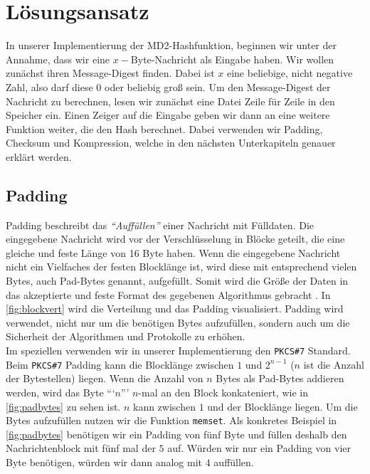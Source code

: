 \documentclass[course=erap]{aspdoc}
\begin{document}
\section{Lösungsansatz}

In unserer Implementierung der MD2-Hashfunktion, beginnen wir unter der Annahme, dass wir eine $x-$Byte-Nachricht als Eingabe haben. Wir wollen zunächst ihren Message-Digest finden. Dabei ist $x$ eine beliebige, nicht negative Zahl, also darf diese $0$ oder beliebig groß sein. Um den Message-Digest der Nachricht zu berechnen, lesen wir zunächst eine Datei Zeile für Zeile in den Speicher ein. Einen Zeiger auf die Eingabe geben wir dann an eine weitere Funktion weiter, die den Hash berechnet. Dabei verwenden wir Padding, Checksum und Kompression, welche in den nächsten Unterkapiteln genauer erklärt werden.  

\subsection{Padding}

Padding beschreibt das \textit{"`Auffüllen"'} einer Nachricht mit Fülldaten. Die eingegebene Nachricht wird vor der Verschlüsselung in Blöcke geteilt, die eine gleiche und feste Länge von 16 Byte haben. Wenn die eingegebene Nachricht nicht ein Vielfaches der festen Blocklänge ist, wird diese mit entsprechend vielen Bytes, auch Pad-Bytes genannt, aufgefüllt\cite{paddingSchwenk}. Somit wird die Größe der Daten in das akzeptierte und feste Format des gegebenen Algorithmus gebracht \cite{paddingA}. In \autoref{fig:blockvert} wird die Verteilung und das Padding visualisiert. Padding wird verwendet, nicht nur um die benötigen Bytes aufzufüllen, sondern auch um die Sicherheit der Algorithmen und Protokolle zu erhöhen\cite{bundes}\cite{kryptografie}.  \\
Im speziellen verwenden wir in unserer Implementierung den \texttt{PKCS\#7} Standard. Beim \texttt{PKCS\#7} Padding kann die Blocklänge zwischen $1$ und $2^{n-1}$ ($n$ ist die Anzahl der Bytestellen) liegen. Wenn die Anzahl von $n$ Bytes als Pad-Bytes addieren werden, wird das Byte “`$n$”' $n$-mal an den Block konkateniert, wie in \autoref{fig:padbytes} zu sehen ist. $n$ kann zwischen $1$ und der Blocklänge liegen\cite{kryptografie}. Um die Bytes aufzufüllen nutzen wir die Funktion \texttt{memset}. Als konkretes Beispiel in \autoref{fig:padbytes} benötigen wir ein Padding von fünf Byte und füllen deshalb den Nachrichtenblock mit fünf mal der $5$ auf. Würden wir nur ein Padding von vier Byte benötigen, würden wir dann analog mit $4$ auffüllen.
\end{document}
